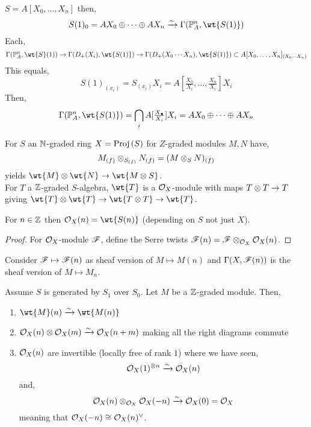 \documentclass[12pt]{article}
\begin{document}
\begin{example}
$S = A[X_0, \dots, X_n]$ then,
\[ S(1)_0 = A X_0 \oplus \cdots \oplus A X_n \iso \Gamma(\P^n_A, \wt{S(1)}) \]
Each,
\[ \Gamma(\P^n_A, \wt{S}(1)) \to \Gamma(D_+(X_i), \wt{S(1)}) \to \Gamma(D_+(X_0 \cdots X_n), \wt{S(1)}) \subset A[X_0, \dots, X_n]_{(X_0 \cdots X_n)} \]
This equals,
\[ S(1)_{(x_i)} = S_{(x_i)} X_i = A[\tfrac{X_0}{X_i}, \dots, \tfrac{X_n}{X_i}] X_i \]
Then,
\[ \Gamma(\P^n_A, \wt{S(1)}) = \bigcap_{i} A[\tfrac{X_\bullet}{X_i}] X_i = A X_0 \oplus \cdots \oplus A X_n \]
\end{example}

For $S$ an $\mathbb{N}$-graded ring $X = \mathrm{Proj}\left( S \right)$ for $Z$-graded modules $M, N$ have,
\[ M_{(f)} \otimes_{S_{(f)}} N_{(f)} = (M \otimes_S N)_{(f)} \]
yields $\wt{M} \ot \wt{N} \to \wt{M \ot S}$.
\bigskip\\
For $T$ a $\mathbb{Z}$-graded $S$-algebra, $\wt{T}$ is a $\mathcal{O}_{X}$-module with maps $T \otimes T \to T$ giving $\wt{T} \ot \wt{T} \to \wt{T \ot T} \to \wt{T}$.

\begin{defn}
For $n \in \mathbb{Z}$ then $\struct{X}(n) = \wt{S(n)}$ (depending on $S$ not just $X$).
\end{defn}

\begin{proof}
For $\mathcal{O}_{X}$-module $\mathscr{F}$, define the Serre twists $\mathscr{F}(n) = \mathscr{F} \otimes_{\mathcal{O}_{X}} \mathcal{O}_{X}(n)$. 
\end{proof}

\begin{rmk}
Consider $\mathscr{F} \mapsto \mathscr{F}(n)$ as sheaf version of $M \mapsto M(n)$ and $\Gamma(X, \mathscr{F}(n))$ is the sheaf version of $M \mapsto M_n$.
\end{rmk}

\begin{thm}
Assume $S$ is generated by $S_1$ over $S_0$. Let $M$ be a $\mathbb{Z}$-graded module. Then,
\begin{enumerate}
\item $\wt{M}(n) \iso \wt{M(n)}$
\item $\mathcal{O}_{X}(n) \otimes \mathcal{O}_{X}(m) \xrightarrow{\sim} \mathcal{O}_{X}(n+m)$ making all the right diagrams commute 
\item $\mathcal{O}_{X}(n)$ are invertible (locally free of rank $1$) where we have seen,
\[ \mathcal{O}_{X}(1)^{\otimes n} \xrightarrow{\sim} \mathcal{O}_{X}(n) \]
and,
\[ \mathcal{O}_{X}(n) \otimes_{\mathcal{O}_{X}} \mathcal{O}_{X}(-n) \xrightarrow{\sim} \mathcal{O}_{X}(0) = \mathcal{O}_{X} \]
meaning that $\mathcal{O}_{X}(-n) \cong \mathcal{O}_{X}(n)^\vee$. 
\end{enumerate}
\end{thm}
\end{document}
